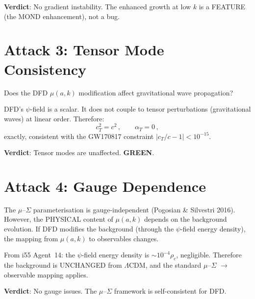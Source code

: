 \documentclass[11pt,a4paper]{article}
\newcommand{\GREEN}{\textcolor{dfdgreen}{\textbf{GREEN}}}
\begin{document}
\textbf{Verdict}: No gradient instability. The enhanced growth at low $k$ is a FEATURE (the MOND enhancement), not a bug.

\section{Attack 3: Tensor Mode Consistency}

Does the DFD $\mu(a,k)$ modification affect gravitational wave propagation?

DFD's $\psi$-field is a scalar. It does not couple to tensor perturbations (gravitational waves) at linear order. Therefore:
\begin{equation}
c_T^2 = c^2\,,\qquad \alpha_T = 0\,,
\end{equation}
exactly, consistent with the GW170817 constraint $|c_T/c - 1| < 10^{-15}$.

\textbf{Verdict}: Tensor modes are unaffected. \GREEN.

\section{Attack 4: Gauge Dependence}

The $\mu$--$\Sigma$ parameterisation is gauge-independent (Pogosian \& Silvestri 2016). However, the PHYSICAL content of $\mu(a,k)$ depends on the background evolution. If DFD modifies the background (through the $\psi$-field energy density), the mapping from $\mu(a,k)$ to observables changes.

From i55 Agent~14: the $\psi$-field energy density is $\sim 10^{-4}\rho_c$, negligible. Therefore the background is UNCHANGED from $\Lambda$CDM, and the standard $\mu$--$\Sigma$ $\to$ observable mapping applies.

\textbf{Verdict}: No gauge issues. The $\mu$--$\Sigma$ framework is self-consistent for DFD.
\end{document}
